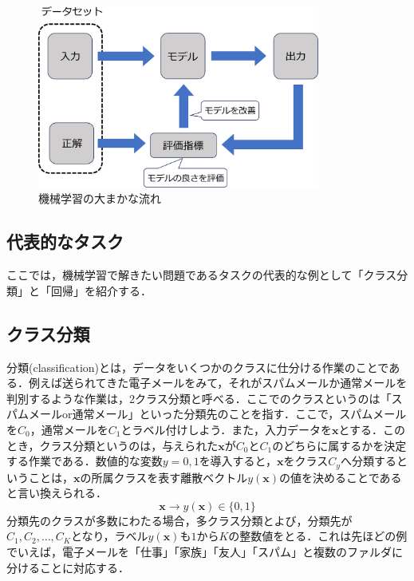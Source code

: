 \documentclass[a4paper,11pt]{jsreport}
\begin{document}
\begin{figure}[t]
  \begin{center}
    \includegraphics[height=6cm]{image/機械学習概要図.png}
    \caption{機械学習の大まかな流れ}
  \end{center}
\end{figure}

\subsection{代表的なタスク}
ここでは，機械学習で解きたい問題であるタスクの代表的な例として「クラス分類」と「回帰」を紹介する．
\subsection*{クラス分類}
分類(classification)とは，データをいくつかのクラスに仕分ける作業のことである．例えば送られてきた電子メールをみて，それがスパムメールか通常メールを判別するような作業は，2クラス分類と呼べる．ここでのクラスというのは「スパムメールor通常メール」といった分類先のことを指す．ここで，スパムメールを$C_0$，通常メールを$C_1$とラベル付けしよう．また，入力データを$\bm{x}$とする．このとき，クラス分類というのは，与えられた$\bm{x}$が$C_0$と$C_1$のどちらに属するかを決定する作業である．数値的な変数$y = 0, 1$を導入すると，$\bm{x}$をクラス$C_{y}$へ分類するということは，$\bm{x}$の所属クラスを表す離散ベクトル$y(\bm{x})$の値を決めることであると言い換えられる．
\begin{equation}
  \bm{x} \longrightarrow y(\bm{x}) \in \{0, 1\}
\end{equation}
分類先のクラスが多数にわたる場合，多クラス分類とよび，分類先が$C_1,C_2,\dots,C_K$となり，ラベル$y(\bm{x})$も$1$から$K$の整数値をとる．これは先ほどの例でいえば，電子メールを「仕事」「家族」「友人」「スパム」と複数のファルダに分けることに対応する．
\end{document}
